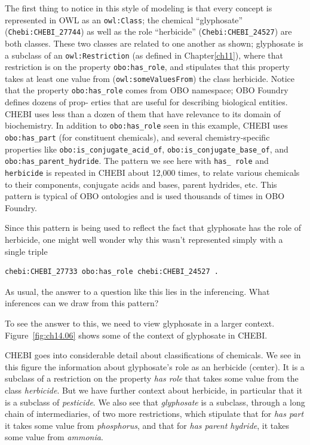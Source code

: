 The first thing to notice in this style of modeling is that every
concept is represented in OWL as an \texttt{owl:Class}; the chemical
``glyphosate'' (\texttt{Chebi:CHEBI\_27744}) as well as the role ``herbicide''
(\texttt{Chebi:CHEBI\_24527}) are both classes. These two classes are related to
one another as shown; glyphosate is a subclass of an \texttt{owl:Restriction} (as
defined in Chapter\ref{ch11}), where that restriction is on the property
\texttt{obo:has\_role}, and stipulates that this property takes at least one
value from (\texttt{owl:someValuesFrom}) the class herbicide. Notice that the
property \texttt{obo:has\_role} comes from OBO namespace; OBO Foundry defines
dozens of prop- erties that are useful for describing biological
entities. CHEBI uses less than a dozen of them that have relevance to
its domain of biochemistry. In addition to \texttt{obo:has\_role} seen in this
example, CHEBI uses \texttt{obo:has\_part} (for constituent chemicals), and
several chemistry-specific properties like \texttt{obo:is\_conjugate\_acid\_of},
\texttt{obo:is\_conjugate\_base\_of}, and \texttt{obo:has\_parent\_hydride}. The pattern
we see here with \texttt{has\_ role} and \texttt{herbicide} is repeated in CHEBI
about 12,000 times, to relate various chemicals to their components,
conjugate acids and bases, parent hydrides, etc. This pattern is typical
of OBO ontologies and is used thousands of times in OBO Foundry.

Since this pattern is being used to reflect the fact that glyphosate has
the role of herbicide, one might well wonder why this wasn't represented
simply with a single triple

\begin{lstlisting}
chebi:CHEBI_27733 obo:has_role chebi:CHEBI_24527 .
\end{lstlisting}

As usual, the answer to a question like this lies in the inferencing.
What inferences can we draw from this pattern?

To see the answer to this, we need to view glyphosate in a larger
context. Figure~\ref{fig:ch14.06} shows some of the context of glyphosate in CHEBI.

CHEBI goes into considerable detail about classifications of chemicals.
We see in this figure the information about glyphosate's role as an
herbicide (center). It is a subclass of a restriction on the property
\textit{has role} that takes some value from the class \textit{herbicide}. But we have
further context about herbicide, in particular that it is a subclass of
\textit{pesticide}. We also see that \textit{glyphosate} is a subclass, through a long
chain of intermediaries, of two more restrictions, which stipulate that
for\textit{ has part} it takes some value from \textit{phosphorus}, and that for\textit{ has
parent hydride}, it takes some value from \textit{ammonia}.


